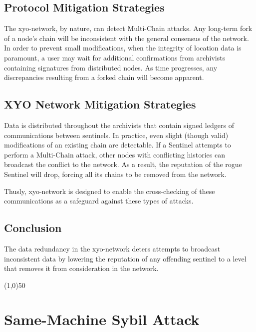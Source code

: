 \documentclass{article}
\begin{document}
\subsection{Protocol Mitigation Strategies}

The \Gls{xyo-network}, by nature, can detect Multi-Chain attacks. Any long-term fork of a node's chain will be inconsistent with the general consensus of the network. In order to prevent small modifications, when the integrity of location data is paramount, a user may wait for additional confirmations from \Glspl{archivist} containing signatures from distributed nodes. As time progresses, any discrepancies resulting from a forked chain will become apparent.

\subsection{XYO Network Mitigation Strategies}

Data is distributed throughout the \Glspl{archivist} that contain signed ledgers of communications between \Glspl{sentinel}. In practice, even slight (though valid) modifications of an existing chain are detectable. If a Sentinel attempts to perform a Multi-Chain attack, other nodes with conflicting histories can broadcast the conflict to the network. As a result, the reputation of the rogue Sentinel will drop, forcing all its chains to be removed from the network.

Thusly, \Gls{xyo-network} is designed to enable the cross-checking of these communications as a safeguard against these types of attacks.

\subsection{Conclusion}

The data redundancy in the \Gls{xyo-network} deters attempts to broadcast inconsistent data by lowering the reputation of any offending \Gls{sentinel} to a level that removes it from consideration in the network.

\begin{center}
\line(1,0){50}
\end{center}

\section{Same-Machine Sybil Attack}
\end{document}
